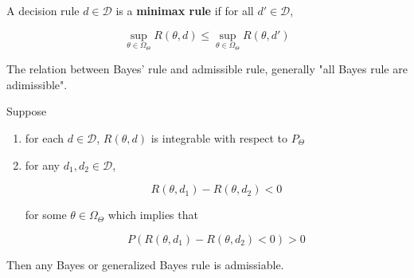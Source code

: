 \documentclass[11pt,fleqn]{book} %
\begin{document}
\begin{definition}
	A decision rule $d\in \mathcal{D}$ is a \textbf{minimax rule} if for all $d' \in \mathcal{D}$, 

			$$\sup_{\theta \in \Omega_\Theta} R(\theta, d) \leq \sup_{\theta \in \Omega_\Theta} R(\theta, d')$$
\end{definition}

The relation between Bayes' rule and admissible rule, generally "all Bayes rule are adimissible". 

\begin{theorem}[1.8 in Notes]

Suppose 

	\begin{enumerate}
		\item for each $d \in \mathcal{D}$, $R(\theta, d)$ is integrable with respect to $P_\Theta$ 
		\item for any $d_1, d_2 \in \mathcal{D}$, 

				$$R(\theta, d_1) - R(\theta, d_2) < 0 $$

		for some $\theta \in \Omega_\Theta$ which implies that

				$$P(R(\theta, d_1) - R(\theta, d_2) < 0 ) > 0$$
	\end{enumerate}

Then any Bayes or generalized Bayes rule is admissiable. 


\end{theorem}
\end{document}

